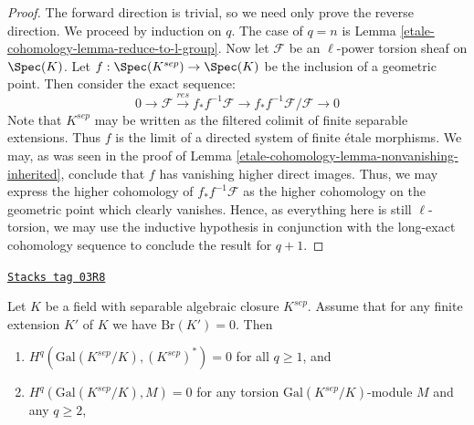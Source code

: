\begin{proof}
The forward direction is trivial, so we need only prove the reverse direction.
We proceed by induction on $q$. The case of $q = n$ is
Lemma \ref{etale-cohomology-lemma-reduce-to-l-group}. Now let
$\mathcal{F}$ be an $\ell$-power torsion sheaf on $\Spec(K)$.
Let $f : \Spec(K^{sep}) \rightarrow \Spec(K)$
be the inclusion of a geometric point.
Then consider the exact sequence:
$$
0 \rightarrow \mathcal{F} \xrightarrow{res}
f_* f^{-1} \mathcal{F} \rightarrow f_* f^{-1} \mathcal{F}/\mathcal{F}
\rightarrow 0
$$
Note that $K^{sep}$ may be written as the filtered colimit of finite
separable extensions. Thus $f$
is the limit of a directed system of finite \'etale  morphisms.
We may, as was seen in the proof of
Lemma \ref{etale-cohomology-lemma-nonvanishing-inherited}, conclude that $f$ has
vanishing higher direct images. Thus, we may express the higher cohomology of
$f_* f^{-1} \mathcal{F}$ as the higher cohomology on the geometric point which
clearly vanishes. Hence, as everything here is still $\ell$-torsion, we may use
the inductive hypothesis in conjunction with the long-exact cohomology sequence
to conclude the result for $q + 1$.
\end{proof}

\begin{proposition}
\label{etale-cohomology-proposition-serre-galois}
\href{https://stacks.math.columbia.edu/tag/03R8}{\texttt{Stacks tag 03R8}}

\begin{reference}
\cite[Chapter II, Section 3, Proposition 5]{SerreGaloisCohomology}
\end{reference}
Let $K$ be a field with separable algebraic closure $K^{sep}$.
Assume that for any finite extension $K'$ of $K$ we have
$\text{Br}(K') = 0$. Then
\begin{enumerate}
\item $H^q(\text{Gal}(K^{sep}/K), (K^{sep})^*) = 0$
for all $q \geq 1$, and
\item $H^q(\text{Gal}(K^{sep}/K), M) = 0$
for any torsion $\text{Gal}(K^{sep}/K)$-module $M$ and any $q \geq 2$,
\end{enumerate}
\end{proposition}

